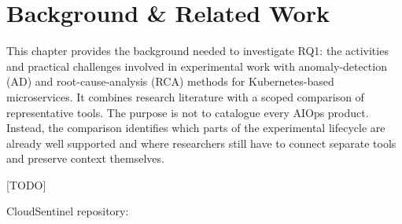 \chapter{Background \& Related Work}%
\label{ch:background}

This chapter provides the background needed to investigate RQ1: the activities and practical challenges involved in experimental work with anomaly-detection (AD) and root-cause-analysis (RCA) methods for Kubernetes-based microservices. It combines research literature with a scoped comparison of representative tools. The purpose is not to catalogue every AIOps product. Instead, the comparison identifies which parts of the experimental lifecycle are already well supported and where researchers still have to connect separate tools and preserve context themselves.

[TODO]

CloudSentinel repository: 
